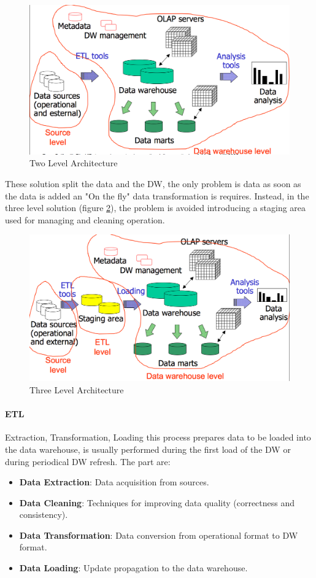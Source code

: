 \documentclass[12pt]{article}
\begin{document}
\begin{figure}[h!]
  \includegraphics[width=\linewidth]{images/2lv.png}
  \caption{Two Level Architecture}
  \label{fig:2lv}
\end{figure}
These solution split the data and the DW, the only problem is data as soon as the data is added an "On the fly" data transformation is requires. Instead, in the three level solution (figure \ref{fig:3lv}), the problem is avoided introducing a staging area used for managing and cleaning operation.

\begin{figure}[h!]
  \includegraphics[width=\linewidth]{images/3lv.png}
  \caption{Three Level Architecture}
  \label{fig:3lv}
\end{figure}

\paragraph{ETL} Extraction, Transformation, Loading this process prepares data to be loaded into the data warehouse, is usually performed during the first load of the DW or during periodical DW refresh. The part are:
\begin{itemize}
  \item \textbf{Data Extraction}: Data acquisition from sources.
  \item \textbf{Data Cleaning}: Techniques for improving data quality (correctness and consistency).
  \item \textbf{Data Transformation}: Data conversion from operational format to DW format.
  \item \textbf{Data Loading}: Update propagation to the data warehouse.
\end{itemize}
\end{document}
